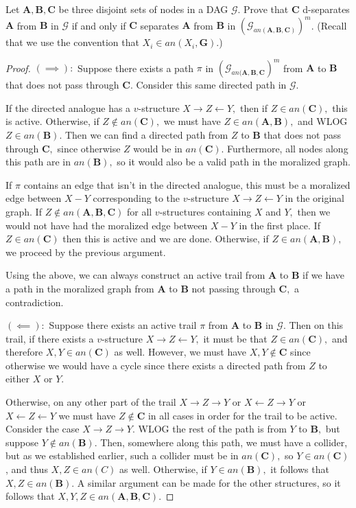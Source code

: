 \documentclass[letterpaper]{article}
\begin{document}
Let $\mathbf{A,B,C}$ be three disjoint sets of nodes in a DAG $\mathcal{G}$. Prove that $\mathbf{C}$ d-separates $\mathbf{A}$ from $\mathbf{B}$ in $\mathcal{G}$ if and only if $\mathbf{C}$ separates $\mathbf{A}$ from $\mathbf{B}$ in $(\mathcal{G}_{an(\mathbf{A,B,C})})^m$. (Recall that we use the convention that $X_i \in an(X_i,\mathbf{G})$.)
\begin{proof}
  $(\implies):$ Suppose there exists a path $\pi$ in $\left( \mathcal{G}_{an(\mathbf{A, B, C}} \right)^m$ from $\mathbf{A}$ to $\mathbf{B}$ that does not pass through $\mathbf{C}.$ Consider this same directed path in $\mathcal{G}.$
    
    If the directed analogue has a $v$-structure $X\to Z\gets Y,$ then if $Z\in an(\mathbf{C}),$ this is active. Otherwise, if $Z\not\in an(\mathbf{C}),$ we must have $Z\in an(\mathbf{A, B}),$ and WLOG $Z\in an(\mathbf{B}).$ Then we can find a directed path from $Z$ to $\mathbf{B}$ that does not pass through $\mathbf{C},$ since otherwise $Z$ would be in $an(\mathbf{C}).$ Furthermore, all nodes along this path are in $an(\mathbf{B}),$ so it would also be a valid path in the moralized graph. 

    If $\pi$ contains an edge that isn't in the directed analogue, this must be a moralized edge between $X-Y$ corresponding to the $v$-structure $X\to Z\gets Y$ in the original graph. If $Z\not\in an(\mathbf{A, B, C})$ for all $v$-structures containing $X$ and $Y,$ then we would not have had the moralized edge between $X-Y$ in the first place. If $Z\in an(\mathbf{C})$ then this is active and we are done. Otherwise, if $Z\in an(\mathbf{A, B}),$ we proceed by the previous argument.  

    Using the above, we can always construct an active trail from $\mathbf{A}$ to $\mathbf{B}$ if we have a path in the moralized graph from $\mathbf{A}$ to $\mathbf{B}$ not passing through $\mathbf{C},$ a contradiction.

    $(\impliedby):$ Suppose there exists an active trail $\pi$ from $\mathbf{A}$ to $\mathbf{B}$ in $\mathcal{G}.$ Then on this trail, if there exists a $v$-structure $X\to Z\gets Y,$ it must be that $Z\in an(\mathbf{C}),$ and therefore $X, Y\in an(\mathbf{C})$ as well. However, we must have $X, Y\not\in\mathbf{C}$ since otherwise we would have a cycle since there exists a directed path from $Z$ to either $X$ or $Y.$ 

    Otherwise, on any other part of the trail $X\to Z\to Y$ or $X\gets Z\to Y$ or $X\gets Z\gets Y$ we must have $Z\not\in\mathbf{C}$ in all cases in order for the trail to be active. Consider the case $X\to Z\to Y.$ WLOG the rest of the path is from $Y$ to $\mathbf{B},$ but suppose $Y\not\in an(\mathbf{B}).$ Then, somewhere along this path, we must have a collider, but as we established earlier, such a collider must be in $an(\mathbf{C}),$ so $Y\in an(\mathbf{C})$, and thus $X, Z\in an(C)$ as well. Otherwise, if $Y\in an(\mathbf{B}),$ it follows that $X, Z\in an(\mathbf{B}).$ A similar argument can be made for the other structures, so it follows that $X, Y, Z\in an(\mathbf{A, B, C}).$
  

\end{proof}
\end{document}
